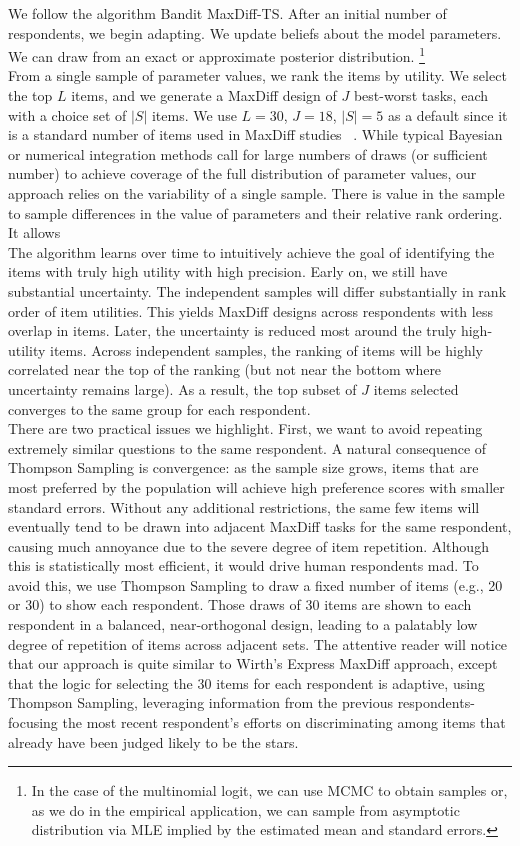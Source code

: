 \documentclass[nonblindrev]{informs3}
\begin{document}
We follow the algorithm Bandit MaxDiff-TS. After an initial number of respondents, we begin adapting. We update beliefs about the model parameters. We can draw from an exact or approximate posterior distribution. \footnote{In the case of the multinomial logit, we can use MCMC to obtain samples or, as we do in the empirical application, we can sample from asymptotic distribution via MLE implied by the estimated mean and standard errors.}\\
From a single sample of parameter values, we rank the items by utility. We select the top $L$ items, and we generate a MaxDiff design of $J$ best-worst tasks, each with a choice set of $|S|$ items.  We use $L=30$, $J=18$, $|S|=5$ as a default since it is a standard number of items used in MaxDiff studies ~\cite{wirth2012largeset}. 
While typical Bayesian or numerical integration methods call for large numbers of draws (or sufficient number) to achieve coverage of the full distribution of parameter values, our  approach relies on the variability of a single sample. There is value in the sample to sample differences in the value of parameters and their relative rank ordering. It allows  \\
The algorithm learns over time to intuitively achieve the goal of identifying the items with truly high utility with high precision. Early on, we still have substantial uncertainty. The independent samples will differ substantially in rank order of item utilities. This yields MaxDiff designs across respondents with less overlap in items. Later, the uncertainty is reduced most around the truly high-utility items. Across independent samples, the ranking of items will be highly correlated near the top of the ranking (but not near the bottom where uncertainty remains large). As a result, the top subset of $J$ items selected converges to the same group for each respondent. \\
There are two practical issues we highlight. First, we want to avoid repeating extremely similar questions to the same respondent. A natural consequence of Thompson Sampling is convergence: as the sample size grows, items that are most preferred by the population will achieve high preference scores with smaller standard errors.  Without any additional restrictions, the same few items will eventually tend to be drawn into adjacent MaxDiff tasks for the same respondent, causing much annoyance due to the severe degree of item repetition.  Although this is statistically most efficient, it would drive human respondents mad.  To avoid this, we use Thompson Sampling to draw a fixed number of items (e.g., 20 or 30) to show each respondent.  Those draws of 30 items are shown to each respondent in a balanced, near-orthogonal design, leading to a palatably low degree of repetition of items across adjacent sets.  The attentive reader will notice that our approach is quite similar to Wirth's Express MaxDiff approach, except that the logic for selecting the 30 items for each respondent is adaptive, using Thompson Sampling, leveraging information from the previous respondents-focusing the most recent respondent's efforts on discriminating among items that already have been judged likely to be the stars.\\
\end{document}
